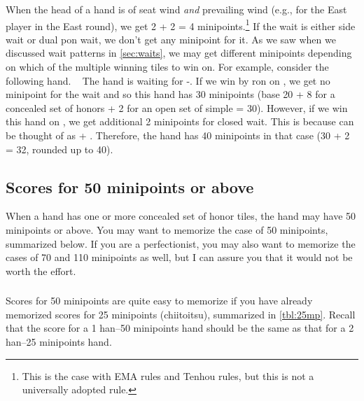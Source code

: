 When the head of a hand is of seat wind \emph{and} prevailing wind (e.g., {\LARGE\dong} for the East player in the East round), we get 2 + 2 = 4 minipoints.\footnote{This is the case with EMA rules and {\jap Tenhou} rules, but this is not a universally adopted rule.} 
If the wait is either side wait or dual {\jap pon} wait, we don't get any minipoint for it.
As we saw when we discussed wait patterns in \ref{sec:waits}, we may get different minipoints depending on which of the multiple winning tiles to win on. 
For example, consider the following hand.
\bp
{}\zhong\zhong\zhong~
\ep
The hand is waiting for {\LARGE{}-}. If we win by {\jap ron} on {\LARGE{}}, we get no minipoint for the wait and so this hand has 30 minipoints (base 20 + 8 for a concealed set of honors + 2 for an open set of simple = 30). However, if we win this hand on {\LARGE{}}, we get additional 2 minipoints for closed wait. This is because {\LARGE{}} can be thought of as {\LARGE{} + }. Therefore, the hand has 40 minipoints in that case (30 + 2 = 32, rounded up to 40). 

\bigskip
\subsection{Scores for 50 minipoints or above}
\bigskip
When a hand has one or more concealed set of honor tiles, the hand may have 50 minipoints or above. You may want to memorize the case of 50 minipoints, summarized below. 
If you are a perfectionist, you may also want to memorize the cases of 70 and 110 minipoints as well, but I can assure you that it would not be worth the effort. 

\subsubsection{}
\noindent Scores for 50 minipoints are quite easy to memorize if you have already memorized scores for 25 minipoints ({\jap chiitoitsu}), summarized in \ref{tbl:25mp}. Recall that the score for a 1 {\jap han}--50 minipoints hand should be the same as that for a 2 {\jap han}--25 minipoints hand.

